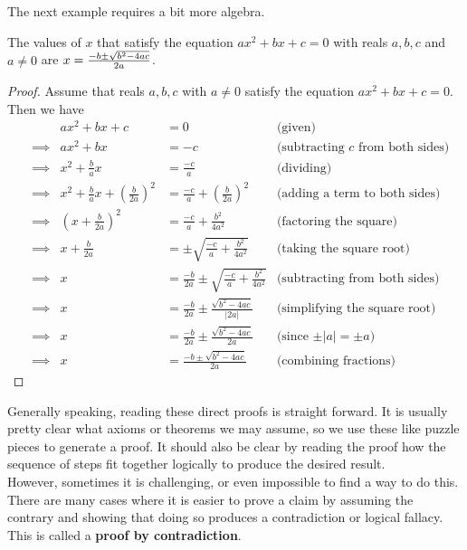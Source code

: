 The next example requires a bit more algebra.
\begin{theorem}
    The values of $x$ that satisfy the equation $ax^2+bx+c=0$ with reals $a,b,c$ and $a\neq 0$ are $x=\Large{\frac{-b\pm\sqrt{b^2 - 4ac}}{2a}}$.
\end{theorem}
\vspace{-3.5mm}
\begin{proof}
    Assume that reals $a,b,c$ with $a\neq 0$ satisfy the equation $ax^2+bx+c=0$. Then we have
    \begin{align*}
        & & ax^2+bx+c &= 0 &\text{(given)}\\
        &\implies & ax^2+bx &= -c &\text{(subtracting $c$ from both sides)}\\
        &\implies & x^2 + \frac{b}{a}x &= \frac{-c}{a} &\text{(dividing)}\\
        &\implies & x^2 + \frac{b}{a}x + \left(\frac{b}{2a}\right)^2 &= \frac{-c}{a} + \left(\frac{b}{2a}\right)^2 &\text{(adding a term to both sides)}\\
        &\implies & \left(x + \frac{b}{2a}\right)^2 &= \frac{-c}{a} + \frac{b^2}{4a^2} &\text{(factoring the square)}\\
        &\implies & x + \frac{b}{2a} &= \pm\sqrt{\frac{-c}{a} + \frac{b^2}{4a^2}} &\text{(taking the square root)}\\
        &\implies & x &= \frac{-b}{2a} \pm\sqrt{\frac{-c}{a} + \frac{b^2}{4a^2}} &\text{(subtracting from both sides)}\\
        &\implies & x &= \frac{-b}{2a}\pm \frac{\sqrt{b^2-4ac}}{|2a|} &\text{(simplifying the square root)}\\
         &\implies & x &= \frac{-b}{2a}\pm \frac{\sqrt{b^2-4ac}}{2a} &\text{(since $\pm|a|=\pm a$)}\\
        &\implies & x &= \frac{-b\pm\sqrt{b^2 - 4ac}}{2a} &\text{(combining fractions)}
    \end{align*}
\end{proof}

Generally speaking, reading these direct proofs is straight forward. It is usually pretty clear what axioms or theorems we may assume, so we use these like puzzle pieces to generate a proof. It should also be clear by reading the proof how the sequence of steps fit together logically to produce the desired result. \\


\clearpage
However, sometimes it is challenging, or even impossible to find a way to do this. There are many cases where it is easier to prove a claim by assuming the contrary and showing that doing so produces a contradiction or logical fallacy. This is called a \textbf{proof by contradiction}. \\

